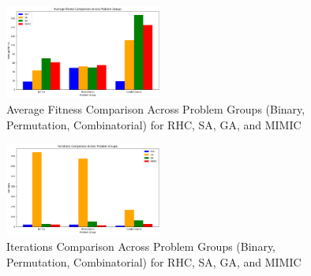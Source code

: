 \begin{figure}[h!]
    \centering
    \includegraphics[width=0.46\textwidth]{image/fitplot.png}
    \caption{Average Fitness Comparison Across Problem Groups (Binary, Permutation, Combinatorial) for RHC, SA, GA, and MIMIC}
    \label{fig:average_fitness_comparison}
\end{figure}

\begin{figure}[h!]
    \centering
    \includegraphics[width=0.46\textwidth]{image/iterplot.png}
    \caption{Iterations Comparison Across Problem Groups (Binary, Permutation, Combinatorial) for RHC, SA, GA, and MIMIC}
    \label{fig:iterations_comparison}
\end{figure}

